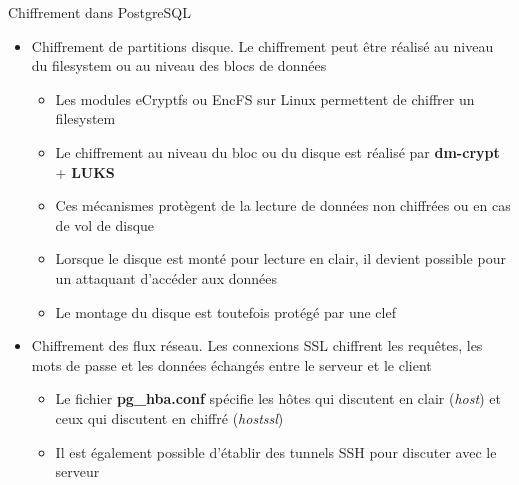 \begin{frame}[fragile]{Chiffrement dans PostgreSQL}

   \begin{itemize}
         \item Chiffrement de partitions disque. Le chiffrement peut être réalisé au niveau du filesystem ou au niveau des blocs de données
         \begin{itemize}
            \item Les modules eCryptfs ou EncFS sur Linux permettent de chiffrer un filesystem
            \item Le chiffrement au niveau du bloc ou du disque est réalisé par \textbf{dm-crypt} + \textbf{LUKS}
            \item Ces mécanismes protègent de la lecture de données non chiffrées ou en cas de vol de disque
            \item Lorsque le disque est monté pour lecture en clair, il devient possible pour un attaquant d'accéder aux données
            \item Le montage du disque est toutefois protégé par une clef
         \end{itemize}
         \item Chiffrement des flux réseau. Les connexions SSL chiffrent les requêtes, les mots de passe et les données échangés entre le serveur et le client
         \begin{itemize}
            \item Le fichier \textbf{pg\_hba.conf} spécifie les hôtes qui discutent en clair (\textit{host}) et ceux qui discutent en chiffré (\textit{hostssl})
            \item Il est également possible d'établir des tunnels SSH pour discuter avec le serveur
         \end{itemize}
   \end{itemize}

\end{frame}


